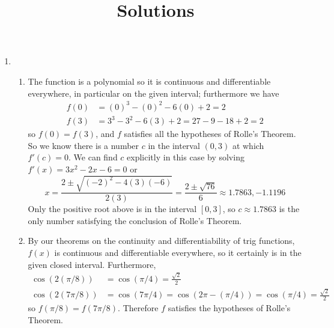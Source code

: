 \documentclass{article}
\title{\commonPSTitleZeroThreeTwo\ Solutions}
\author{\commonAuthor}
\date{\commonDateZeroThreeTwo}
\begin{document}
\maketitle
\begin{enumerate}
\item %
  \begin{enumerate}
  \item %
    The function is a polynomial so it is continuous and differentiable
    everywhere, in particular on the given interval; furthermore we have
    \begin{align*}
      f(0)&=(0)^3-(0)^2-6(0)+2=2\\
      f(3)&=3^3-3^2-6(3)+2=27-9-18+2=2
    \end{align*}
    so $f(0)=f(3)$, and $f$ satisfies all the hypotheses of Rolle's Theorem.
    So we know there is a number $c$ in the interval $(0,3)$ at which
    $f'(c)=0$.  We can find $c$ explicitly in this case by solving
    $f'(x)=3x^2-2x-6=0$ or 
    \begin{equation*}
      x = \frac{2\pm \sqrt{(-2)^2-4(3)(-6)}}{2(3)}
      = \frac{2\pm \sqrt{76}}{6}
      \approx 1.7863, -1.1196
    \end{equation*}
    Only the positive root above is in the interval $[0,3]$, so $c\approx
    1.7863$ is the only number satisfying the conclusion of Rolle's Theorem.
  \item %
    By our theorems on the continuity and differentiability of trig
    functions, $f(x)$ is continuous and differentiable everywhere, so it
    certainly is in the given closed interval.  Furthermore,
    \begin{align*}
      \cos(2(\pi/8))  
      &= \cos(\pi/4)=\frac{\sqrt{2}}{2}
      \\
      \cos(2(7\pi/8)) 
      &= \cos(7\pi/4) = \cos(2\pi-(\pi/4))=\cos(\pi/4)=\frac{\sqrt{2}}{2}
    \end{align*}
    so $f(\pi/8)=f(7\pi/8)$.  Therefore $f$ satisfies the hypotheses of 
    Rolle's Theorem.  


\end{enumerate}
\end{enumerate}
\end{document}
